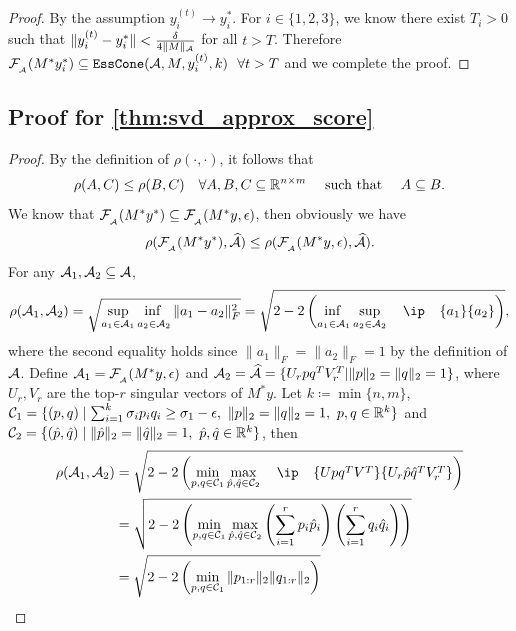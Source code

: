 \begin{proof}
    By the assumption $y_i^{(t)} \to y_i^*$. For $i \in \{1,2,3\}$, we know there exist $T_i > 0$ such that $\| y_i^{(t)} - y_i^* \| < \frac{\delta}{4\| M \|_{\mathcal{A}}}$ for all $t > T$. Therefore $\mathcal{F}_{\scriptscriptstyle _{\scriptscriptstyle\mathcal{A}}}( M^* y_i^*) \subseteq \texttt{EssCone}(\mathcal{A}, M, y_i^{(t)}, k)~~\forall t > T$ and we complete the proof.
\end{proof}

\subsection{Proof for \autoref{thm:svd_approx_score}}
\begin{proof}
  By the definition of $\rho(\cdot, \cdot)$, it follows that
  \[
    \rho(A, C) \leq \rho(B, C) \quad \forall A, B, C \subseteq \mathbb{R}^{n \times m} ~\hbox{\quad such that\quad}~ A \subseteq B.
  \]
  We know that $ \mathcal{F}_{\scriptscriptstyle _{\scriptscriptstyle\mathcal{A}}}( M^* y^* ) \subseteq  \mathcal{F}_{\scriptscriptstyle _{\scriptscriptstyle\mathcal{A}}}( M^* y, \epsilon )$, then obviously we have 
  \[
    \rho( \mathcal{F}_{\scriptscriptstyle _{\scriptscriptstyle\mathcal{A}}}( M^* y^* ), \widehat{\mathcal{A}}  ) \leq \rho( \mathcal{F}_{\scriptscriptstyle _{\scriptscriptstyle\mathcal{A}}}( M^* y, \epsilon ), \widehat{\mathcal{A}}  ).
  \]
  For any $\mathcal{A}_1, \mathcal{A}_2 \subseteq \mathcal{A}$,
  \begin{align}
    \rho( \Ascr_1, \Ascr_2 ) = \sqrt{ \adjustlimits\sup_{a_1 \in \Ascr_1} \inf_{a_2 \in \Ascr_2} \| a_1 - a_2 \|_F^2 } = \sqrt{ 2 - 2 \left( \adjustlimits \inf_{a_1 \in \Ascr_1} \sup_{a_2 \in \Ascr_2} \ip{a_1}{a_2} \right) }, \label{eq:norm2ip}
  \end{align}
  where the second equality holds since $\| a_1 \|_F = \| a_2 \|_F = 1$ by the definition of $\mathcal{A}$. Define $\mathcal{A}_1 = \mathcal{F}_{\scriptscriptstyle _{\scriptscriptstyle\mathcal{A}}}( M^* y, \epsilon )$ and $\mathcal{A}_2 = \widehat{\mathcal{A}} = \{ U_r p q^T V_r^T | \|p\|_2 = \|q\|_2 = 1 \}$, where $U_r, V_r$ are the top-$r$ singular vectors of $M^*y$. Let $k \coloneqq \min\{n,m\}$, $\mathcal{C}_1 = \{(p, q) \mid \sum_{i=1}^{k} \sigma_i p_i q_i \geq \sigma_1 - \epsilon,~ \|p\|_2 = \|q\|_2 = 1, ~p,q \in \mathbb{R}^{ k }\}$ and $\mathcal{C}_2 = \{(\hat{p}, \hat{q}) \mid \|\hat{p}\|_2 = \|\hat{q}\|_2 = 1, ~\hat{p},\hat{q} \in \mathbb{R}^{ k }\}$, then
  \begin{align}
    \rho( \Ascr_1, \Ascr_2  ) & = \sqrt{ 2 - 2 \left( \min_{p, q \in \Cscr_1} \max_{ \hat{p}, \hat{q} \in \Cscr_2} \ip{ Up q^T V^T }{ U_r \hat{p} \hat{q}^T V_r^T } \right) } \nonumber \\
    & = \sqrt{ 2 - 2 \left( \min_{p, q \in \Cscr_1} \max_{ \hat{p}, \hat{q} \in \Cscr_2} \left( \sum_{i=1}^r p_i \hat{p}_i \right) \left( \sum_{i=1}^r q_i \hat{q}_i \right) \right) } \nonumber \\
    & = \sqrt{ 2 - 2 \left(\min_{p, q \in \Cscr_1} \| p_{1:r} \|_2 \| q_{1:r} \|_2 \right) } \label{eq:rho_exp} 

\end{align}
\end{proof}
